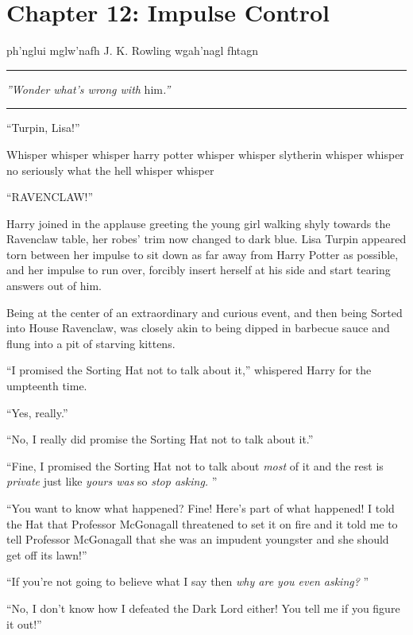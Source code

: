 \chapter{Chapter 12: Impulse Control}
ph'nglui mglw'nafh J. K. Rowling wgah'nagl fhtagn

\begin{center}\rule{3in}{0.4pt}\end{center}

\emph{''Wonder what's wrong with} him\emph{.''}

\begin{center}\rule{3in}{0.4pt}\end{center}

``Turpin, Lisa!''

Whisper whisper whisper harry potter whisper whisper slytherin whisper
whisper no seriously what the hell whisper whisper

``RAVENCLAW!''

Harry joined in the applause greeting the young girl walking shyly
towards the Ravenclaw table, her robes' trim now changed to dark blue.
Lisa Turpin appeared torn between her impulse to sit down as far away
from Harry Potter as possible, and her impulse to run over, forcibly
insert herself at his side and start tearing answers out of him.

Being at the center of an extraordinary and curious event, and then
being Sorted into House Ravenclaw, was closely akin to being dipped in
barbecue sauce and flung into a pit of starving kittens.

``I promised the Sorting Hat not to talk about it,'' whispered Harry for
the umpteenth time.

``Yes, really.''

``No, I really did promise the Sorting Hat not to talk about it.''

``Fine, I promised the Sorting Hat not to talk about \emph{most} of it
and the rest is \emph{private} just like \emph{yours was} so \emph{stop
asking.} ''

``You want to know what happened? Fine! Here's part of what happened! I
told the Hat that Professor McGonagall threatened to set it on fire and
it told me to tell Professor McGonagall that she was an impudent
youngster and she should get off its lawn!''

``If you're not going to believe what I say then \emph{why are you even
asking?} ''

``No, I don't know how I defeated the Dark Lord either! You tell me if
you figure it out!''

